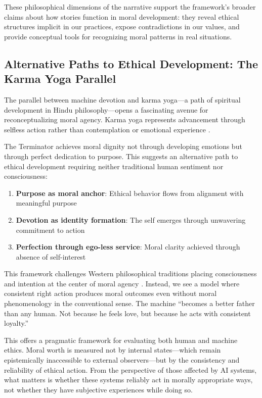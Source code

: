 \documentclass[12pt]{article}
\begin{document}
These philosophical dimensions of the narrative support the framework's broader claims about how stories function in moral development: they reveal ethical structures implicit in our practices, expose contradictions in our values, and provide conceptual tools for recognizing moral patterns in real situations.

\subsection{Alternative Paths to Ethical Development: The Karma Yoga Parallel}

The parallel between machine devotion and karma yoga---a path of spiritual development in Hindu philosophy---opens a fascinating avenue for reconceptualizing moral agency. Karma yoga represents advancement through selfless action rather than contemplation or emotional experience \citep{bhagavad_gita}.

The Terminator achieves moral dignity not through developing emotions but through perfect dedication to purpose. This suggests an alternative path to ethical development requiring neither traditional human sentiment nor consciousness:

\begin{enumerate}
\item \textbf{Purpose as moral anchor}: Ethical behavior flows from alignment with meaningful purpose
\item \textbf{Devotion as identity formation}: The self emerges through unwavering commitment to action
\item \textbf{Perfection through ego-less service}: Moral clarity achieved through absence of self-interest
\end{enumerate}

This framework challenges Western philosophical traditions placing consciousness and intention at the center of moral agency \citep{kant1785groundwork}. Instead, we see a model where consistent right action produces moral outcomes even without moral phenomenology in the conventional sense. The machine ``becomes a better father than any human. Not because he feels love, but because he acts with consistent loyalty.''

This offers a pragmatic framework for evaluating both human and machine ethics. Moral worth is measured not by internal states---which remain epistemically inaccessible to external observers---but by the consistency and reliability of ethical action. From the perspective of those affected by AI systems, what matters is whether these systems reliably act in morally appropriate ways, not whether they have subjective experiences while doing so.
\end{document}
